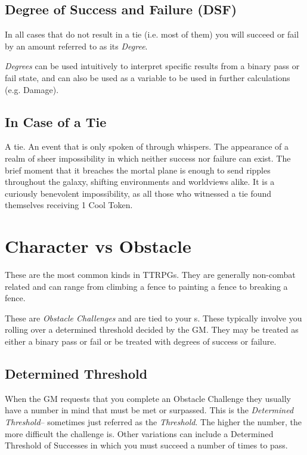 
\subsection{Degree of Success and Failure (DSF)}\label{subsec:dsf}
In all cases that do not result in a tie (i.e. most of them) you will
succeed or fail by an amount referred to as its \emph{Degree}. 


\emph{Degrees} can be used intuitively to interpret specific results from
a binary pass or fail state, and can also be used as a variable to be used in further calculations
(e.g. Damage).

\subsection{In Case of a Tie}\label{subsec:tie}
A tie. An event that is only spoken of through whispers. The appearance of a realm of sheer impossibility in which neither success nor failure can exist. The brief moment that it breaches the mortal plane is enough to send ripples throughout the galaxy, shifting environments and worldviews alike. It is a curiously benevolent impossibility, as all those who witnessed a tie found themselves receiving 1 Cool Token.

\section{Character vs Obstacle}\label{sec:vs_obstacle}
These are the most common kinds in TTRPGs. They are generally non-combat
related and can range from climbing a fence to painting a fence to
breaking a fence. 

These are \emph{Obstacle Challenges} and are tied to your \attribute s.
These typically involve you rolling over a determined threshold decided
by the GM. They may be treated as either a binary pass or fail or be
treated with degrees of success or failure.

\subsection{Determined Threshold}\label{subsec:determined_threshold}
When the GM requests that you complete an Obstacle Challenge they
usually have a number in mind that must be met or surpassed. This
is the \emph{Determined Threshold}-- sometimes just referred as the \emph{Threshold}. The higher the number, the more
difficult the challenge is. Other variations can include a Determined
Threshold of Successes in
which you must succeed a number of times to pass.

